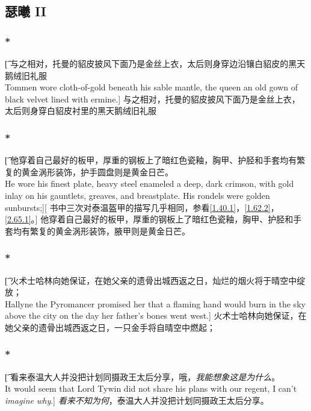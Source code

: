 \documentclass[12pt,a4paper]{article}
\begin{document}
\subsection{瑟曦 II}
\subsubsection{\color{red}*}\t[
	与之相对，托曼的貂皮披风下面乃是金丝上衣，太后则身穿边沿镶白貂皮的黑天鹅绒旧礼服\\
	Tommen wore cloth-of-gold beneath his sable mantle, the queen an old gown of black velvet lined with ermine.]
	与之相对，托曼的貂皮披风下面乃是金丝上衣，太后则身穿白貂皮衬里的黑天鹅绒旧礼服
	
\subsubsection{\color{red}*}\label{4.7.1}\t[
他穿着自己最好的板甲，厚重的钢板上了暗红色瓷釉，胸甲、护胫和手套均有繁复的黄金涡形装饰，护手圆盘则是黄金日芒。\\
He wore his finest plate, heavy steel enameled a deep, dark crimson, with gold inlay on his gauntlets, greaves, and breastplate. His rondels were golden sunbursts;][
书中三次对泰温盔甲的描写几乎相同，参看\ref{1.40.1}，\ref{1.62.2}，\ref{2.65.1}。]
他穿着自己最好的板甲，厚重的钢板上了暗红色瓷釉，胸甲、护胫和手套均有繁复的黄金涡形装饰，腋甲则是黄金日芒。


\subsubsection{\color{red}*}\t[
	火术士哈林向她保证，在她父亲的遗骨出城西返之日，灿烂的烟火将于晴空中绽放；\\
	Hallyne the Pyromancer promised her that a flaming hand would burn in the sky above the city on the day her father's bones went west.]
	火术士哈林向她保证，在她父亲的遗骨出城西返之日，一只金手将自晴空中燃起；
		
\subsubsection{\color{red}*}\t[
	看来泰温大人并没把计划同摄政王太后分享，哦，\emph{我能想象这是为什么}。\\
	It would seem that Lord Tywin did not share his plans with our regent, I can't \emph{imagine why}.]
	\emph{看来不知为何}，泰温大人并没把计划同摄政王太后分享。
	
\end{document}

